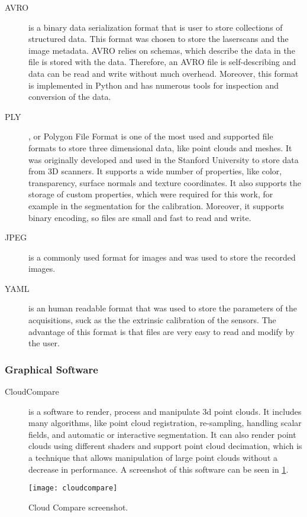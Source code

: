 \begin{description}
    
    \item[AVRO] is a binary data serialization format that is user to store collections of structured data. This format was chosen to store the laserscans and the image metadata. AVRO relies on schemas, which describe the data in the file is stored with the data. Therefore, an AVRO file is self-describing and data can be read and write without much overhead. Moreover, this format is implemented in Python and has numerous tools for inspection and conversion of the data.

    \item[PLY], or Polygon File Format is one of the most used and supported file formats to store three dimensional data, like point clouds and meshes. It was originally developed and used in the Stanford University to store data from 3D scanners. It supports a wide number of properties, like color, transparency, surface normals and texture coordinates. It also supports the storage of custom properties, which were required for this work, for example in the segmentation for the calibration. Moreover, it supports binary encoding, so files are small and fast to read and write.

    \item[JPEG] is a commonly used format for images and was used to store the recorded images.

    \item[YAML] is an human readable format that was used to store the parameters of the acquisitions, suck as the the extrinsic calibration of the sensors. The advantage of this format is that files are very easy to read and modify by the user.

\end{description}

\subsubsection{Graphical Software}

\begin{description}
    
    \item[CloudCompare] is a software to render, process and manipulate 3d point clouds. It includes many algorithms, like point cloud registration, re-sampling, handling scalar fields, and automatic or interactive segmentation. It can also render point clouds using different shaders and support point cloud decimation, which is a technique that allows manipulation of large point clouds without a decrease in performance. A screenshot of this software can be seen in \cref{fig:cloud-compare}.

\end{description}

\begin{figure}[h]
    \centering
    \texttt{[image: cloudcompare]}
    \caption{Cloud Compare screenshot.}
    \label{fig:cloud-compare}
\end{figure}